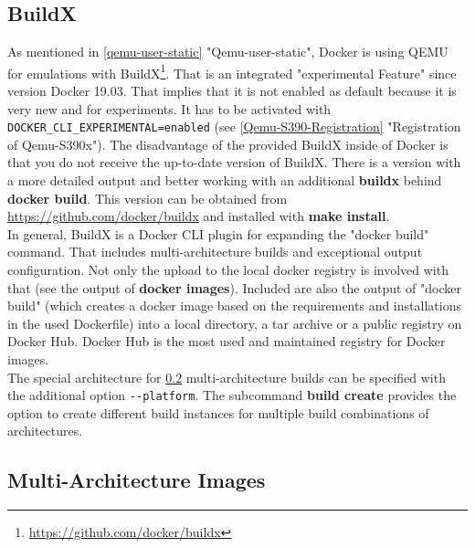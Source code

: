 \subsection{BuildX}\label{BuildX}

As mentioned in \ref{qemu-user-static} "Qemu-user-static", Docker is using \gls{QEMU} for emulations with BuildX\footnote{\url{https://github.com/docker/buildx}}. That is an integrated "experimental Feature" since version Docker 19.03. That implies that it is not enabled as default because it is very new and for experiments. It has to be activated with \lstinline!DOCKER_CLI_EXPERIMENTAL=enabled! (see \ref{Qemu-S390-Registration} "Registration of Qemu-S390x"). The disadvantage of the provided BuildX inside of Docker is that you do not receive the up-to-date version of BuildX. There is a version with a more detailed output and better working with an additional \textbf{buildx} behind \textbf{docker build}. This version can be obtained from \url{https://github.com/docker/buildx} and installed with \textbf{make install}. \\
In general, BuildX is a Docker CLI plugin for expanding the "docker build" command. That includes multi-architecture builds and exceptional output configuration. Not only the upload to the local docker registry is involved with that (see the output of \textbf{docker images}). Included are also the output of "docker build" (which creates a docker image based on the requirements and installations in the used Dockerfile) into a local directory, a tar archive or a public registry on Docker Hub. Docker Hub is the most used and maintained registry for Docker images. \\
The special architecture for \ref{MultiArchitectureImages} multi-architecture builds can be specified with the additional option \verb+--platform+.
The subcommand \textbf{build create} provides the option to create different build instances for multiple build combinations of architectures.

\subsection{Multi-Architecture Images}\label{MultiArchitectureImages}

